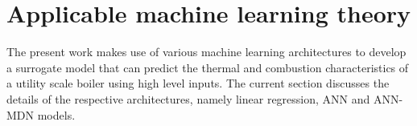 \documentclass[a4paper,fleqn]{cas-dc}
\newtheorem{theorem}{Algorithm}
\newtheorem{lemma}[theorem]{Lemma}
\begin{document}







\section{Applicable machine learning theory}
The present work makes use of various machine learning architectures to develop a surrogate model that can predict the thermal and combustion characteristics of a utility scale boiler using high level inputs. The current section discusses the details of the respective architectures, namely linear regression, ANN and ANN-MDN models.  
\end{document}
